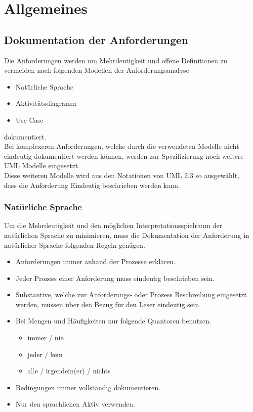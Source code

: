 \section{Allgemeines}

\subsection{Dokumentation der Anforderungen}

Die Anforderungen werden um Mehrdeutigkeit und offene Definitionen zu vermeiden nach folgenden Modellen der Anforderungsanalyse

\begin{itemize}
	\item Natürliche Sprache
	\item Aktivitätsdiagramm
	\item Use Case
\end{itemize}

dokumentiert. \\
Bei komplexeren Anforderungen, welche durch die verwendeten Modelle nicht eindeutig dokumentiert werden können, werden zur Spezifizierung noch weitere UML Modelle eingesetzt. \\

Diese weiteren Modelle wird aus den Notationen von UML 2.3 so ausgewählt, dass die Anforderung Eindeutig beschrieben werden kann.

\subsubsection{Natürliche Sprache}

Um die Mehrdeutigkeit und den möglichen Interpretationsspielraum der natürlichen Sprache zu minimieren, muss die Dokumentation der Anforderung in natürlicher Sprache folgenden Regeln genügen.

\begin{itemize}
	\item Anforderungen immer anhand der Prozesse erklären.
	\item Jeder Prozess einer Anforderung muss eindeutig beschrieben sein.
	\item Substantive, welche zur Anforderungs- oder Prozess Beschreibung eingesetzt werden, müssen über den Bezug für den Leser eindeutig sein.
	\item Bei Mengen und Häufigkeiten nur folgende Quantoren benutzen.
	\begin{itemize}
		\item immer / nie
		\item jeder / kein
		\item alle / irgendein(er) / nichts
	\end{itemize}
	\item Bedingungen immer vollständig dokumentieren.
	\item Nur den sprachlichen Aktiv verwenden.
\end{itemize}

